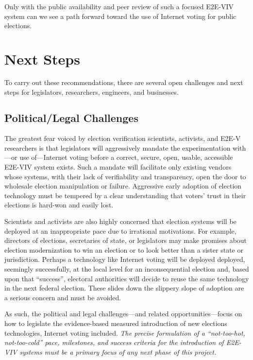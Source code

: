 Only with the public availability and peer review of such a focused
E2E-VIV system can we see a path forward toward the use of Internet
voting for public elections.

\section{Next Steps}
\label{sec:next-steps}

To carry out these recommendations, there are several open challenges
and next steps for legislators, researchers, engineers, and
businesses.

\subsection{Political/Legal Challenges}

The greatest fear voiced by election verification scientists,
activists, and E2E-V researchers is that legislators will aggressively
mandate the experimentation with---or use of---Internet voting before
a correct, secure, open, usable, accessible E2E-VIV system
exists. Such a mandate will facilitate only existing vendors whose
systems, with their lack of verifiability and transparency, open the
door to wholesale election manipulation or failure. Aggressive early
adoption of election technology must be tempered by a clear
understanding that voters' trust in their elections is hard-won and
easily lost.

Scientists and activists are also highly concerned that election
systems will be deployed at an inappropriate pace due to irrational
motivations. For example, directors of elections, secretaries of
state, or legislators may make promises about election modernization
to win an election or to look better than a sister state or
jurisdiction. Perhaps a technology like Internet voting will be
deployed deployed, seemingly successfully, at the local level for an
inconsequential election and, based upon that ``success'', electoral
authorities will decide to reuse the same technology in the next
federal election. These slides down the slippery slope of adoption are
a serious concern and must be avoided.

As such, the political and legal challenges---and related
opportunities---focus on how to legislate the evidence-based measured
introduction of new elections technologies, Internet voting
included. \emph{The precise formulation of a ``not-too-hot,
  not-too-cold'' pace, milestones, and success criteria for the
  introduction of E2E-VIV systems must be a primary focus of any next
  phase of this project.}

